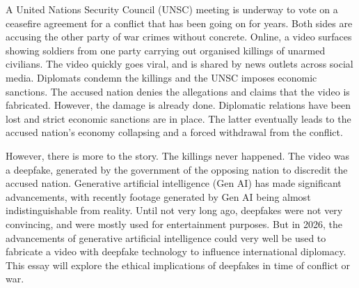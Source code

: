 
A United Nations Security Council (UNSC) meeting is underway to vote on a ceasefire agreement for a conflict that has been going on for years. Both sides are accusing the other party of war crimes without concrete. Online, a video surfaces showing soldiers from one party carrying out organised killings of unarmed civilians. The video quickly goes viral, and is shared by news outlets across social media. Diplomats condemn the killings and the UNSC imposes economic sanctions. The accused nation denies the allegations and claims that the video is fabricated. However, the damage is already done. Diplomatic relations have been lost and strict economic sanctions are in place. The latter eventually leads to the accused nation's economy collapsing and a forced withdrawal from the conflict.




However, there is more to the story. The killings never happened. The video was a deepfake, generated by the government of the opposing nation to discredit the accused nation.
Generative artificial intelligence (Gen AI) has made significant advancements, with recently footage generated by Gen AI being almost indistinguishable from reality.
Until not very long ago, deepfakes were not very convincing, and were mostly used for entertainment purposes. But in 2026, the advancements of generative artificial intelligence could very well be used to fabricate a video with deepfake technology to influence international diplomacy.
This essay will explore the ethical implications of deepfakes in time of conflict or war.